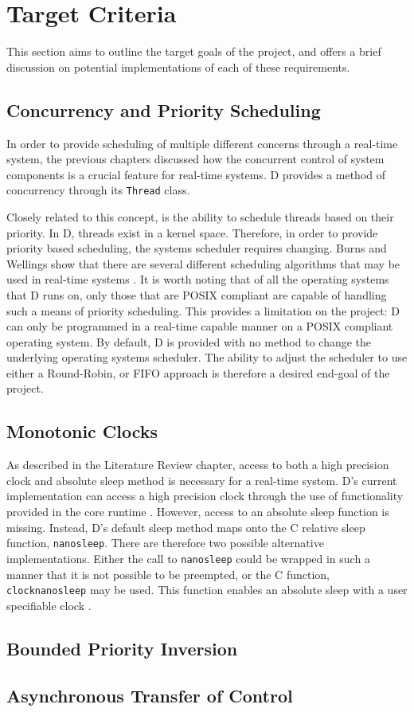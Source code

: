 \section{Target Criteria} %
This section aims to outline the target goals of the project, and offers a
brief discussion on potential implementations of each of these requirements. 

\subsection{Concurrency and Priority Scheduling} %
In order to provide scheduling of multiple different concerns through a
real-time system, the previous chapters discussed how the concurrent control of
system components is a crucial feature for real-time systems. D provides a
method of concurrency through its \texttt{Thread} class. 
\par\bigskip\noindent
Closely related to this concept, is the ability to schedule threads based on
their priority. In D, threads exist in a kernel space. Therefore, in order to
provide priority based scheduling, the systems scheduler requires changing. Burns
and Wellings show that there are several different scheduling algorithms that
may be used in real-time systems \cite{real-time-systems}. It is worth noting
that of all the operating systems that D runs on, only those that are POSIX
compliant are capable of handling such a means of priority scheduling. This
provides a limitation on the project: D can only be programmed in a real-time
capable manner on a POSIX compliant operating system.
By default, D is provided with no method to change the underlying operating
systems scheduler. 
The ability to adjust the scheduler to use either a Round-Robin, or FIFO approach 
is therefore a desired end-goal of the project.

\subsection{Monotonic Clocks} %
As described in the Literature Review chapter, access to both a high precision
clock and absolute sleep method is necessary for a real-time system. D's
current implementation can access a high precision clock through the use of
functionality provided in the core runtime \cite{dlang-core-time}. However,
access to an absolute sleep function is missing. Instead, D's default sleep
method maps onto the C relative sleep function, \texttt{nanosleep}. There are
therefore two possible alternative implementations. Either the call to
\texttt{nanosleep} could be wrapped in such a manner that it is not possible to be preempted, 
or the C function, \texttt{clock\textunderscore{}nanosleep} may be used. This function enables 
an absolute sleep with a user specifiable clock \cite{clock-nanosleep}. 

\subsection{Bounded Priority Inversion} %

\subsection{Asynchronous Transfer of Control} %
